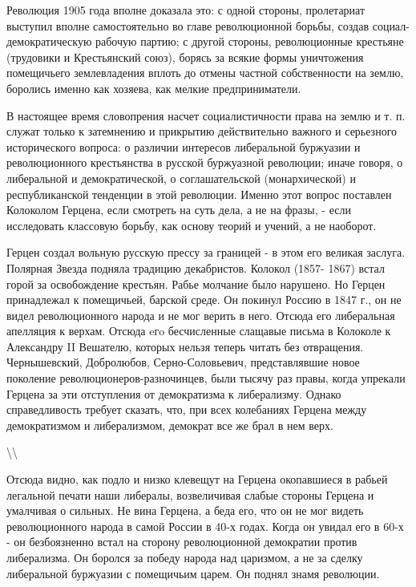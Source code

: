 \documentclass[12pt]{article}
\newcommand\ellipsis{%
  \textbackslash\thinspace\textellipsis\textbackslash
}
\newcommand{\parnum}{(\arabic{parcount})}
\newcounter{parcount}
\newcommand\p{%
    \stepcounter{parcount}%
    \noindent\marginpar[]{\parnum}%
}
\newenvironment{parnumbers}{%
  \par%
  \everypar{\noindent \stepcounter{parcount}\marginpar[]{\parnum}}%
}{}
\begin{document}
\begin{parnumbers}
Революция 1905 года вполне доказала это: с одной стороны, пролетариат выступил вполне самостоятельно во главе революционной борьбы, создав социал-демократическую рабочую партию; с другой стороны, революционные крестьяне (трудовики и Крестьянский союз), борясь за всякие формы уничтожения помещичьего землевладения вплоть до отмены частной собственности на землю, боролись именно как хозяева, как мелкие предприниматели.

В настоящее время словопрения насчет социалистичности права на землю и т. п. служат только к затемнению и прикрытию действительно важного и серьезного исторического вопроса: о различии интересов либеральной буржуазии и революционного крестьянства в русской буржуазной революции; иначе говоря, о либеральной и демократической, о соглашательской (монархической) и республиканской тенденции в этой революции. Именно этот вопрос поставлен Колоколом Герцена, если смотреть на суть дела, а не на фразы, - если исследовать классовую борьбу, как основу теорий и учений, а не наоборот.

Герцен создал вольную русскую прессу за границей - в этом его великая заслуга. Полярная Звезда подняла традицию декабристов. Колокол (1857- 1867) встал горой за освобождение крестьян. Рабье молчание было нарушено. Но Герцен принадлежал к помещичьей, барской среде. Он покинул Россию в 1847 г., он не видел революционного народа и не мог верить в него. Отсюда его либеральная апелляция к верхам. Отсюда eгo бесчисленные слащавые письма в Колоколе к Александру II Вешателю, которых нельзя теперь читать без отвращения. Чернышевский, Добролюбов, Серно-Соловьевич, представлявшие новое поколение революционеров-разночинцев, были тысячу раз правы, когда упрекали Герцена за эти отступления от демократизма к либерализму. Однако справедливость требует сказать, что, при всех колебаниях Герцена между демократизмом и либерализмом, демократ все же брал в нем верх.
\end{parnumbers}

\ellipsis

\p Отсюда видно, как подло и низко клевещут на Герцена окопавшиеся в рабьей легальной печати наши либералы, возвеличивая слабые стороны Герцена и умалчивая о сильных. Не вина Герцена, а беда его, что он не мог видеть революционного народа в самой России в 40-х годах. Когда он увидал его в 60-х - он безбоязненно встал на сторону революционной демократии против либерализма. Он боролся за победу народа над царизмом, а не за сделку либеральной буржуазии с помещичьим царем. Он поднял знамя революции.
\end{document}
